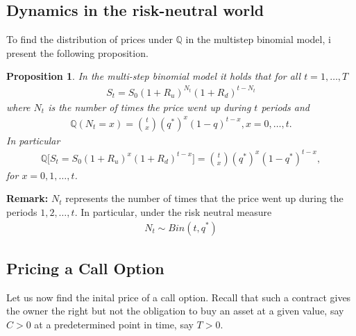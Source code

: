 \documentclass{article}
\newtheorem{proposition}[theorem]{Proposition}
\theoremstyle{definition}
\numberwithin{equation}{section}
\begin{document}
\subsection{Dynamics in the risk-neutral world}
To find the distribution of prices under $\mathbb{Q}$ in the multistep binomial model, i present the following proposition. 
\begin{proposition}
    In the multi-step binomial model it holds that for all $t = 1, \ldots, T$
    \begin{align}
        S_t = S_0(1 + R_u)^{N_t}(1+R_d)^{t-N_t}
    \end{align}
    where $N_t$ is the number of times the price went up during $t$ periods and
    \begin{align}
        \mathbb{Q}(N_t = x) = \binom{t}{x}(q^*)^x(1-q)^{t-x}, x = 0, \ldots, t. 
    \end{align}
    In particular 
    \begin{align}
        \mathbb{Q} \Big[S_t = S_0(1+R_u)^x(1+R_d)^{t-x}\Big] = \binom{t}{x} (q^*)^x(1-q^*)^{t-x},
    \end{align}
    for $x = 0, 1, \ldots, t$. 
\end{proposition}
\textbf{Remark:} $N_t$ represents the number of times that the price went up during the periods $1, 2, \ldots, t$. In particular, under the risk neutral measure
\begin{align}
    N_t \sim Bin(t, q^*)
\end{align}

\subsection{Pricing a Call Option}
Let us now find the inital price of a call option. 
Recall that such a contract gives the owner the right but not the obligation to buy an asset at a given value, say $C > 0$ at a predetermined point in time, say $T > 0$. 
\end{document}
